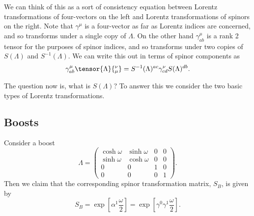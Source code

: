 \documentclass[fleqn]{NotesClass}
\begin{document}
    We can think of this as a sort of consistency equation between Lorentz transformations of four-vectors on the left and Lorentz transformations of spinors on the right.
    Note that \(\gamma^\mu\) is a four-vector as far as Lorentz indices are concerned, and so transforms under a single copy of \(\Lambda\).
    On the other hand \(\gamma^\mu_{ab}\) is a rank 2 tensor for the purposes of spinor indices, and so transforms under two copies of \(S(\Lambda)\) and \(S^{-1}(\Lambda)\).
    We can write this out in terms of spinor components as
    \begin{equation}
        \gamma^\mu_{ab} \tensor{\Lambda}{^\nu_\mu} = S^{-1}(\Lambda)^{ac} \gamma^\nu_{cd} S(\Lambda)^{db}.
    \end{equation}
    
    The question now is, what is \(S(\Lambda)\)?
    To answer this we consider the two basic types of Lorentz transformations.
    
    \subsection{Boosts}
    Consider a boost
    \begin{equation}
        \Lambda = 
        \begin{pmatrix}
            \cosh \omega & \sinh \omega & 0 & 0\\
            \sinh \omega & \cosh \omega & 0 & 0\\
            0 & 0 & 1 & 0\\
            0 & 0 & 0 & 1
        \end{pmatrix}
        .
    \end{equation}
    Then we claim that the corresponding spinor transformation matrix, \(S_B\), is given by
    \begin{equation}
        S_B = \exp\left[ \alpha^1 \frac{\omega}{2} \right] = \exp\left[ \gamma^0\gamma^1 \frac{\omega}{2} \right].
    \end{equation}
    
\end{document}
